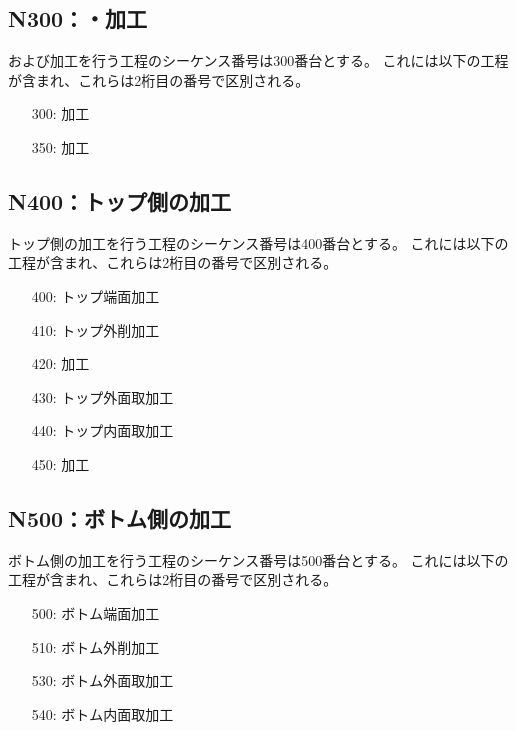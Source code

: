 \subsection{N300：\Dimple ・\ReliefGroove 加工}
\Dimple および\nameReliefGroove 加工を行う工程のシーケンス番号は300番台とする。
これには以下の工程が含まれ、これらは2桁目の番号で区別される。
\begin{enumerate}
\item[300:] \Dimple 加工
\item[350:] \ReliefGroove 加工
\end{enumerate}


\subsection{N400：トップ側の加工}
トップ側の加工を行う工程のシーケンス番号は400番台とする。
これには以下の工程が含まれ、これらは2桁目の番号で区別される。
\begin{enumerate}
\item[400:] トップ端面加工
\item[410:] トップ外削加工
\item[420:] \Keyway 加工
\item[430:] トップ外面取加工
\item[440:] トップ内面取加工
\item[450:] \TanmenZaguri 加工
\end{enumerate}


\clearpage
\subsection{N500：ボトム側の加工}
ボトム側の加工を行う工程のシーケンス番号は500番台とする。
これには以下の工程が含まれ、これらは2桁目の番号で区別される。
\begin{enumerate}
\item[500:] ボトム端面加工
\item[510:] ボトム外削加工
\item[530:] ボトム外面取加工
\item[540:] ボトム内面取加工
\end{enumerate}


